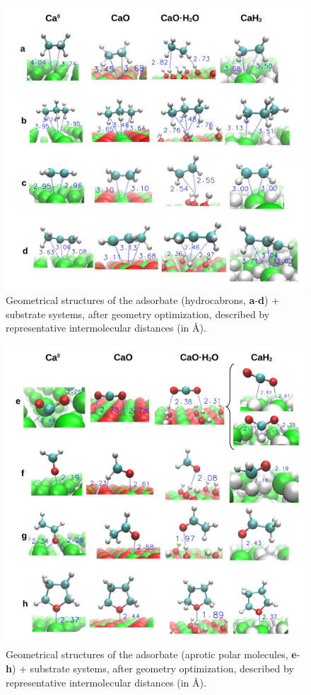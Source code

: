 \documentclass[journal=jpccck,manuscript=article]{achemso}
\begin{document}
\begin{figure}[!b]
	\centering
	\includegraphics[width=\linewidth]{Figure8}
	\caption{Geometrical structures of the adsorbate (hydrocabrons, \textbf{a}-\textbf{d}) + substrate systems, after geometry optimization, described by representative intermolecular distances (in \si{\angstrom}).}
	\label{fig:distsad}
\end{figure}

\begin{figure}[!h]
	\centering
	\includegraphics[width=\linewidth]{Figure9}
	\caption{Geometrical structures of the adsorbate (aprotic polar molecules, \textbf{e}-\textbf{h}) + substrate systems, after geometry optimization, described by representative intermolecular distances (in \si{\angstrom}).}
	\label{fig:distsei}
\end{figure}
\end{document}
